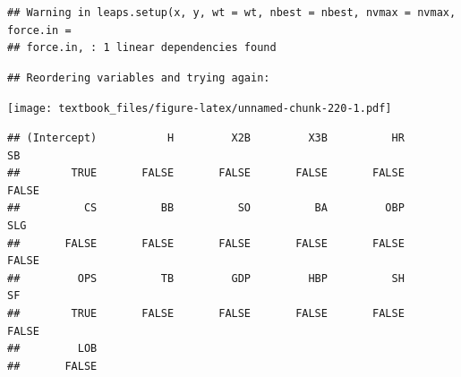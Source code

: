 \documentclass[
  11pt,
]{book}
\newenvironment{Shaded}{\begin{snugshade}}{\end{snugshade}}
\newcommand{\AttributeTok}[1]{\textcolor[rgb]{0.77,0.63,0.00}{#1}}
\newcommand{\CommentTok}[1]{\textcolor[rgb]{0.56,0.35,0.01}{\textit{#1}}}
\newcommand{\DecValTok}[1]{\textcolor[rgb]{0.00,0.00,0.81}{#1}}
\newcommand{\FunctionTok}[1]{\textcolor[rgb]{0.00,0.00,0.00}{#1}}
\newcommand{\NormalTok}[1]{#1}
\newcommand{\OtherTok}[1]{\textcolor[rgb]{0.56,0.35,0.01}{#1}}
\newcommand{\SpecialCharTok}[1]{\textcolor[rgb]{0.00,0.00,0.00}{#1}}
\newcommand{\StringTok}[1]{\textcolor[rgb]{0.31,0.60,0.02}{#1}}
\theoremstyle{definition}
\theoremstyle{definition}
\theoremstyle{definition}
\theoremstyle{definition}
\theoremstyle{remark}
\begin{document}
\begin{verbatim}
## Warning in leaps.setup(x, y, wt = wt, nbest = nbest, nvmax = nvmax, force.in =
## force.in, : 1 linear dependencies found
\end{verbatim}

\begin{verbatim}
## Reordering variables and trying again:
\end{verbatim}

\begin{Shaded}
\end{Shaded}

\texttt{[image: textbook\_files/figure-latex/unnamed-chunk-220-1.pdf]}

\newpage

\begin{Shaded}
\end{Shaded}

\begin{verbatim}
## (Intercept)           H         X2B         X3B          HR          SB 
##        TRUE       FALSE       FALSE       FALSE       FALSE       FALSE 
##          CS          BB          SO          BA         OBP         SLG 
##       FALSE       FALSE       FALSE       FALSE       FALSE       FALSE 
##         OPS          TB         GDP         HBP          SH          SF 
##        TRUE       FALSE       FALSE       FALSE       FALSE       FALSE 
##         LOB 
##       FALSE
\end{verbatim}
\end{document}
